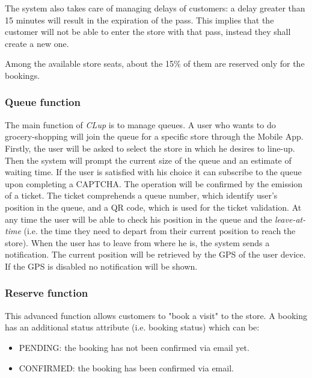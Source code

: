 	The system also takes care of managing delays of customers: a delay greater than 15 minutes will result in the expiration of the pass. This implies that the customer will not be able to enter the store with that pass, instead they shall create a new one.

	Among the available store seats, about the 15\% of them are reserved only for the bookings.

	\subsubsection{Queue function}
	The main function of \textit{CLup} is to manage queues. A user who wants to do grocery-shopping will join the queue for a specific store through the Mobile App.\newline
	Firstly, the user will be asked to select the store in which he desires to line-up.\newline
	Then the system will prompt the current size of the queue and an estimate of waiting time. If the user is satisfied with his choice it can subscribe to the queue upon completing a CAPTCHA. The operation will be confirmed by the emission of a ticket. The ticket comprehends a queue number, which identify user's position in the queue, and a QR code, which is used for the ticket validation. At any time the user will be able to check his position in the queue and the \textit{leave-at-time} (i.e. the time they need to depart from their current position to reach the store). When the user has to leave from where he is, the system sends a notification. The current position will be retrieved by the GPS of the user device. If the GPS is disabled no notification will be shown.

	\subsubsection{Reserve function}
	This advanced function allows customers to "book a visit" to the store.
	A booking has an additional status attribute (i.e. booking status) which can be:
	\begin{itemize}
		\item PENDING: the booking has not been confirmed via email yet.
		\item CONFIRMED: the booking has been confirmed via email.
	\end{itemize}

